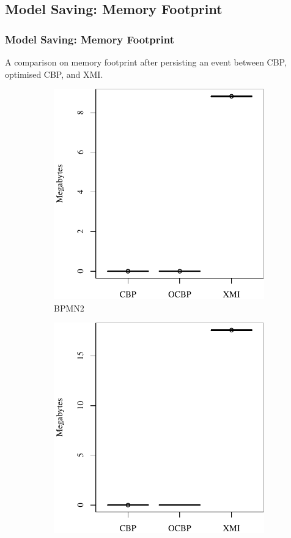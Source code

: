 \documentclass{beamer}
\begin{document}
\begin{frame}[fragile]
\section{Model Saving: Memory Footprint}
\frametitle{Model Saving: Memory Footprint}
A comparison on memory footprint after persisting an event between CBP, optimised CBP, and XMI.
\begin{figure}
    \begin{subfigure}{0.325\textwidth}
        \centering
        \includegraphics[width=\linewidth]{save_memory_bpmn2}
        \caption{BPMN2}
        \label{fig:save_memory_bpmn2}
    \end{subfigure}
    \hfill
    \begin{subfigure}{0.325\textwidth}
        \centering
        \includegraphics[width=\linewidth]{save_memory_epsilon}

\end{subfigure}
\end{figure}
\end{frame}
\end{document}
